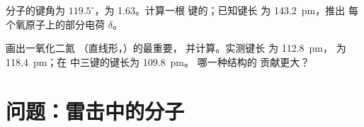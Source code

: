 \begin{exercise}[$\star\star\star$]\label{exo:b1:lewis-resonance-vsepr:11}
 分子的键角为 $119.5^\circ$，为
\qty{1.63}{\debye}。计算一根  键的；已知键长
为 \qty{143.2}{pm}，推出
每个氧原子上的部分电荷 $\delta$。
\end{exercise}

\begin{exercise}[$\star\star\star$]\label{exo:b1:lewis-resonance-vsepr:12}
画出一氧化二氮 （直线形，）的最重要，
并计算。实测键长  为 \qty{112.8}{pm}， 为
\qty{118.4}{pm}；在  中三键的键长为 \qty{109.8}{pm}。
哪一种结构的
贡献更大？
\end{exercise}

\section{问题：雷击中的分子}


